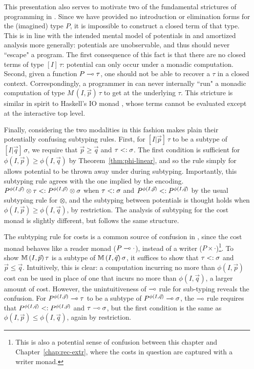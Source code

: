 This presentation also serves to motivate two of the fundamental strictures of programming in \dlambdaamor. Since we have provided no introduction or elimination forms for the (imagined) type $P$, it is impossible to construct a closed term of that type. This is in line with the intended mental model of potentials in \dlambdaamor and amortized analysis more generally: potentials are unobservable, and thus should never ``escape" a program. The first consequence of this fact is that there are no closed terms of type $[I] \, \tau$: potential can only occur under a monadic computation. Second, given a function $P \multimap \tau$, one should not be able to recover a $\tau$ in a closed context. Correspondingly, a programmer in \dlambdaamor can never internally ``run" a monadic computation of type $M \, (I,\vec{p}) \, \tau$ to get at the underlying $\tau$. This stricture is similar in spirit to Haskell's IO monad \citehere, whose terms cannot be evaluated except at the interactive top level. 

Finally, considering the two modalities in this fashion makes plain their potentially confusing subtyping rules. First, for $[I|\vec{p}] \, \tau$ to be a subtype of $[I|\vec{q}] \, \sigma$, we require that $\vec{p} \geq \vec{q}$ and $\tau <: \sigma$. The first condition is sufficient for $\phi(I,\vec{p}) \geq \phi(I,\vec{q})$ by Theorem~\ref{thm:phi-linear}, and so the rule simply for allows potential to be thrown away under during subtyping. Importantly, this subtyping rule agrees with the one implied by the encoding. $P^{\phi(I,\vec{p})} \otimes \tau <: P^{\phi(I,\vec{p})} \otimes \sigma$ when $\tau <: \sigma$ and $P^{\phi(I,\vec{p})} <: P^{\phi(I,\vec{q})}$ by the usual subtyping rule for $\otimes$, and the subtyping between potentials is thought holds when $\phi(I,\vec{p}) \geq \phi(I,\vec{q})$, by restriction. The analysis of subtyping for the cost monad is slightly different, but follows the same structure.

The subtyping rule for costs is a common source of confusion in \dlambdaamor, since the cost monad behaves like a reader monad ($P \multimap \cdot$), instead of a writer ($P \times \cdot$)\footnote{
This is also a potential sense of confusion between this chapter and Chapter~\ref{chap:rec-extr}, where the costs in question are captured with a writer monad.
}. To show $\mathbb{M} \, (I,\vec{p}) \, \tau$ is a subtype of $\mathbb{M} \, (I,\vec{q}) \, \sigma$, it suffices to show that $\tau <: \sigma$ and $\vec{p} \leq \vec{q}$. Intuitively, this is clear: a computation incurring no more than $\phi(I,\vec{p})$ cost can be used in place of one that incurs no more than $\phi(I,\vec{q})$, a larger amount of cost. However, the unintuitiveness of $\multimap$ rule for sub-typing reveals the confusion. For $P^{\phi(I,\vec{p})} \multimap \tau$ to be a subtype of $P^{\phi(I,\vec{q})} \multimap \sigma$, the $\multimap$ rule requires that $P^{\phi(I,\vec{q})} <: P^{\phi(I,\vec{p})}$ and $\tau \multimap \sigma$, but the first condition is the same as $\phi(I,\vec{p}) \leq \phi(I,\vec{q})$, again by restriction.

